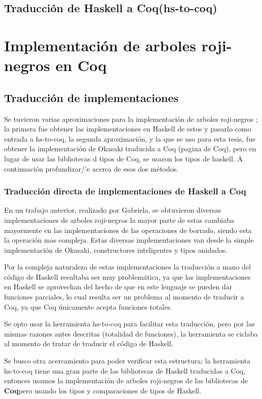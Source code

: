 \documentclass[letterpaper,12pt,oneside]{book}
\newcommand{\coq}{\textbf{Coq}}
\newcommand{\arns}{arboles roji-negros }
\theoremstyle{plain}
\theoremstyle{definition}
\theoremstyle{remark}
\begin{document}
\section{Traducción de Haskell a \coq (hs-to-coq)}

\chapter{Implementación de arboles roji-negros en \coq}
\section{Traducción de implementaciones}
Se tuvieron varias aproximaciones para la implementación de \arns; la primera fue obtener las implementaciones en
Haskell de estos\cite{tesisG} y pasarlo como entrada a hs-to-coq, la 
segunda aproximación, y la que se uso para esta tesis, fue obtener la implementación de Okasaki traducida a Coq 
(pagina de Coq), pero en lugar de usar las bibliotecas d tipos de Coq, se usaron los tipos de haskell.
A continuación profundizar/'e acerca de esos dos métodos.
\subsection{Traducción directa de implementaciones de Haskell a Coq}
En un trabajo anterior, realizado por Gabriela, se obtuvieron diversas implementaciones de \arns la mayor parte de estas
cambiaba mayormente en las implementaciones de las operaciones de borrado, siendo esta la operación mas compleja. 
Estas diversas implementaciones van desde la simple implementación de Okasaki, constructores inteligentes y tipos anidados.

Por la compleja naturaleza de estas implementaciones la traducción a mano del código de Haskell resultaba ser muy problemática,
ya que las implementaciones en Haskell se aprovechan del hecho de que en este lenguaje se pueden dar funciones parciales, 
lo cual resulta ser un problema al momento de traducir a Coq, ya que Coq únicamente acepta funciones totales.

Se opto usar la herramienta hs-to-coq para facilitar esta traducci\'on, pero por las mismas razones antes descritas (totalidad de funciones),
la herramienta se ciclaba al momento de tratar de traducir el c\'odigo de Haskell. 

Se busco otra acercamiento para poder verificar esta estructura; la herramienta hs-to-coq tiene una gran parte de las bibliotecas de Haskell 
traducidas a Coq, entonces usamos la implementación de \arns de las bibliotecas de \coq pero usando los tipos y comparaciones de tipos de Haskell.
\end{document}
